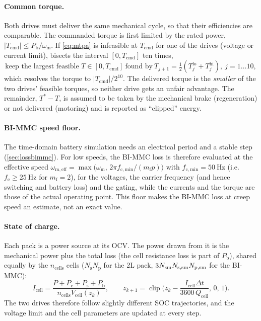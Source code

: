 \paragraph{Common torque.} Both drives must deliver the same mechanical cycle, so that their efficiencies are comparable. The commanded torque is first limited by the rated power, $|T_\mathrm{cmd}|\le P_\mathrm{b}/\omega_\mathrm{m}$. If \cref{eq:mtpa} is infeasible at $T_\mathrm{cmd}$ for one of the drives (voltage or current limit),  bisects the interval $[0,T_\mathrm{cmd}]$ ten times,
\begin{equation}
\text{keep the largest feasible } T\in[0,T_\mathrm{cmd}]\ \text{found by}\ T_{j+1}=\tfrac12(T_j^\mathrm{lo}+T_j^\mathrm{hi}),\ j=1\dots10,
\label{eq:bisect}
\end{equation}
which resolves the torque to $|T_\mathrm{cmd}|/2^{10}$. The delivered torque is the \emph{smaller} of the two drives' feasible torques, so neither drive gets an unfair advantage. The remainder, $T^*-T$, is assumed to be taken by the mechanical brake (regeneration) or not delivered (motoring) and is reported as ``clipped'' energy.

\paragraph{BI-MMC speed floor.} The time-domain battery simulation needs an electrical period and a stable step (\cref{sec:lossbimmc}). For low speeds, the BI-MMC loss is therefore evaluated at the effective speed $\omega_\mathrm{m,eff}=\max\big(\omega_\mathrm{m},\,2\pi f_\mathrm{c,min}/(m_\mathrm{f}p)\big)$ with $f_\mathrm{c,min}=\SI{50}{\hertz}$ (i.e.\ $f_\mathrm{e}\ge\SI{25}{\hertz}$ for $m_\mathrm{f}=2$), for the voltages, the carrier frequency (and hence switching and battery loss) and the gating, while the currents and the torque are those of the actual operating point. This floor makes the BI-MMC loss at creep speed an estimate, not an exact value.

\paragraph{State of charge.} Each pack is a power source at its OCV. The power drawn from it is the mechanical power plus the total loss (the cell resistance loss is part of $P_\mathrm{b}$), shared equally by the $n_\mathrm{cells}$ cells ($N_\mathrm{s}N_\mathrm{p}$ for the 2L pack, $3N_\mathrm{sm}N_\mathrm{s,sm}N_\mathrm{p,sm}$ for the BI-MMC):
\begin{equation}
I_\mathrm{cell}=\frac{P+P_\mathrm{c}+P_\mathrm{s}+P_\mathrm{b}}{n_\mathrm{cells}V_\mathrm{cell}(z_k)},\qquad
z_{k+1}=\operatorname{clip}\Big(z_k-\frac{I_\mathrm{cell}\Delta t}{3600\,Q_\mathrm{cell}},\,0,\,1\Big).
\label{eq:soc}
\end{equation}
The two drives therefore follow slightly different SOC trajectories, and the voltage limit and the cell parameters are updated at every step.

